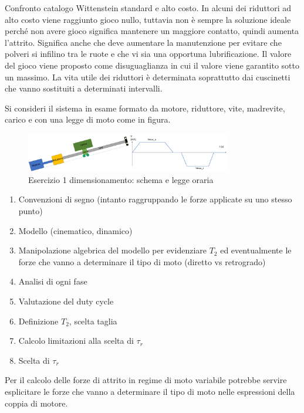 Confronto catalogo Wittenstein standard e alto costo. In alcuni dei riduttori ad alto costo viene raggiunto gioco nullo, tuttavia non è sempre la soluzione ideale perché non avere gioco significa mantenere un maggiore contatto, quindi aumenta l'attrito. Significa anche che deve aumentare la manutenzione per evitare che polveri si infilino tra le ruote e che vi sia una opportuna lubrificazione. 
Il valore del gioco viene proposto come disuguaglianza in cui il valore viene garantito sotto un massimo.
La vita utile dei riduttori è determinata soprattutto dai cuscinetti che vanno sostituiti a determinati intervalli.

Si consideri il sistema in esame formato da motore, riduttore, vite, madrevite, carico e con una legge di moto come in figura.

\begin{figure}[h]
    \centering
    \includegraphics[width=0.8\textwidth]{Immagini/esercizio1_dim_rid_vite.png}
    \caption{Esercizio 1 dimensionamento: schema e legge oraria}
\end{figure}

\begin{enumerate}[label=\roman*.]
    \item Convenzioni di segno (intanto raggruppando le forze applicate su uno stesso punto)
    \item Modello (cinematico, dinamico)
    \item Manipolazione algebrica del modello per evidenziare $T_2$ ed eventualmente le forze che vanno a determinare il tipo di moto (diretto vs retrogrado)
    \item Analisi di ogni fase
    \item Valutazione del duty cycle
    \item Definizione $T_2$, scelta taglia
    \item Calcolo limitazioni alla scelta di $\tau_r$
    \item Scelta di $\tau_r$
\end{enumerate}

Per il calcolo delle forze di attrito in regime di moto variabile potrebbe servire esplicitare le forze che vanno a determinare il tipo di moto nelle espressioni della coppia di motore.

